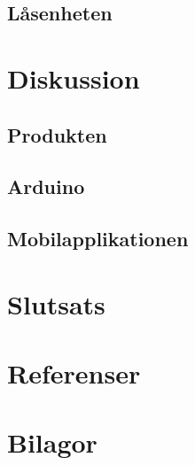 \documentclass[11pt]{article}
\begin{document}
\subsection{Låsenheten}

\section{Diskussion}

\subsection{Produkten}

\subsection{Arduino}

\subsection{Mobilapplikationen}

\section{Slutsats}

\section*{Referenser}

\section*{Bilagor}
\end{document}
